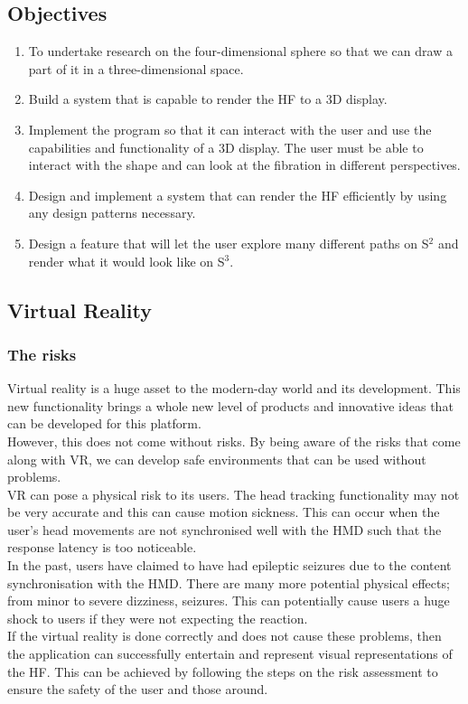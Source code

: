\documentclass[12pt]{article} %
\begin{document}
\begin{flushleft}
\subsection{Objectives}
\begin{enumerate}
\item To undertake research on the four-dimensional sphere so that we can draw a part of it in a three-dimensional space.
\item Build a system that is capable to render the HF to a 3D display. 
\item Implement the program so that it can interact with the user and use the capabilities and functionality of a 3D display. The user must be able to interact with the shape and can look at the fibration in different perspectives. 
\item Design and implement a system that can render the HF efficiently by using any design patterns necessary.
\item Design a feature that will let the user explore many different paths on S$^{2}$ and render what it would look like on S$^{3}$. 
\end{enumerate}
\subsection{Virtual Reality}
\subsubsection{The risks}
Virtual reality is a huge asset to the modern-day world and its development. This new functionality brings a whole new level of products and innovative ideas that can be developed for this platform.\\
However, this does not come without risks. By being aware of the risks that come along with VR, we can develop safe environments that can be used without problems. \\
VR can pose a physical risk to its users. The head tracking functionality may not be very accurate and this can cause motion sickness. This can occur when the user’s head movements are not synchronised well with the HMD such that the response latency is too noticeable.\\
In the past, users have claimed to have had epileptic seizures due to the content synchronisation with the HMD. There are many more potential physical effects; from minor to severe dizziness, seizures. This can potentially cause users a huge shock to users if they were not expecting the reaction. \\
If the virtual reality is done correctly and does not cause these problems, then the application can successfully entertain and represent visual representations of the HF. This can be achieved by following the steps on the risk assessment to ensure the safety of the user and those around.

\end{flushleft}
\end{document}
